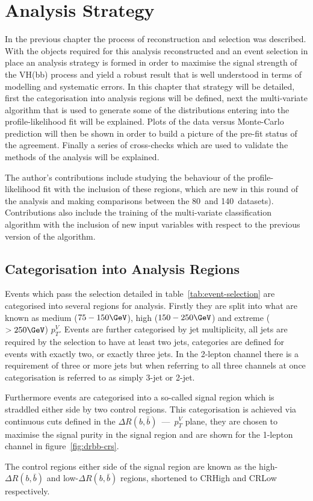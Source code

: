 \chapter{Analysis Strategy}%
\label{ch:strategy}
In the previous chapter the process of reconstruction and selection was
described. With the objects required for this analysis reconstructed and an
event selection in place an analysis strategy is formed in order to maximise the
signal strength of the VH(bb) process and yield a robust result that is well
understood in terms of modelling and systematic errors. In this chapter that
strategy will be detailed, first the categorisation into analysis regions will
be defined, next the multi-variate algorithm that is used to generate some of
the distributions entering into the profile-likelihood fit will be explained.
Plots of the data versus Monte-Carlo prediction will then be shown in order to
build a picture of the pre-fit status of the agreement. Finally a series of
cross-checks which are used to validate the methods of the analysis will be
explained.

The author's contributions include studying the behaviour of the
profile-likelihood fit with the inclusion of these regions, which are new in
this round of the analysis and making comparisons between the 80~\invfb and
140~\invfb datasets). Contributions also include the training of the
multi-variate classification algorithm with the inclusion of new input variables
with respect to the previous version of the algorithm.

\section{Categorisation into Analysis Regions}
\label{sec:ana-regions}

Events which pass the selection detailed in table~\ref{tab:event-selection} are
categorised into several regions for analysis. Firstly they are split into what
are known as medium ($75 - 150 \GeV$), high ($150 - 250 \GeV$) and extreme ($ >
250 \GeV$) $p_T^{V}$. Events are further categorised by jet multiplicity, all
jets are required by the selection to have at least two jets, categories are
defined for events with exactly two, or exactly three jets. In the 2-lepton
channel there is a requirement of three or more jets but when referring to all
three channels at once categorisation is referred to as simply 3-jet or 2-jet.

Furthermore events are categorised into a so-called signal region which is
straddled either side by two control regions. This categorisation is achieved
via continuous cuts defined in the $\Delta R(b, \bar{b})$~---~$p_T^{V}$ plane,
they are chosen to maximise the signal purity in the signal region and are shown
for the 1-lepton channel in figure~\ref{fig:drbb-crs}.

The control regions either side of the signal region are known as the
high-$\Delta R(b, \bar{b})$ and low-$\Delta R(b, \bar{b})$ regions, shortened to
CRHigh and CRLow respectively.

